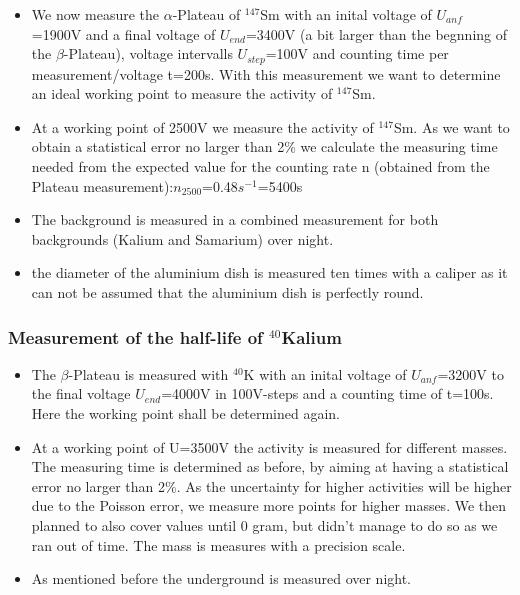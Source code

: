 \documentclass[12pt]{article}
\begin{document}
\begin{itemize}
	
	\item We now measure the $\alpha$-Plateau of ${}^{147}$Sm with an inital voltage of $U_{anf}$=1900V and a final voltage of $U_{end}$=3400V (a bit larger than the begnning of the $\beta$-Plateau), voltage intervalls $U_{step}$=100V and counting time per measurement/voltage t=200s. With this measurement we want to determine an ideal working point to measure the activity of ${}^{147}$Sm.
	
	\item At a working point of 2500V we measure the activity of ${}^{147}$Sm.
      As we want to obtain a statistical error no larger than 2\% we calculate the measuring time needed from the expected value for the counting rate n (obtained from the Plateau measurement):$n_{2500}$=0.48$s^{-1}$=5400s
      
    \item The background is measured in a combined measurement for both backgrounds (Kalium and Samarium) over night.
    
    \item the diameter of the aluminium dish is measured ten times with a caliper as it can not be assumed that the aluminium dish is perfectly round. 

\end{itemize}

\subsubsection{Measurement of the half-life of ${}^{40}$Kalium}
\label{kaliumdurchfuehrung}

\begin{itemize}
	\item The $\beta$-Plateau is measured with ${}^{40}$K with an inital voltage of $U_{anf}$=3200V to the final voltage $U_{end}$=4000V in 100V-steps and a counting time of t=100s. Here the working point shall be determined again.
	
	\item At a working point of U=3500V  the activity is measured for different masses. The measuring time is determined as before, by aiming at having a statistical error no larger than 2\%. As the uncertainty for higher activities will be higher due to the Poisson error, we measure more points for higher masses. We then planned to also cover values until 0 gram, but didn't manage to do so as we ran out of time. The mass is measures with a precision scale.
	
	\item As mentioned before the underground is measured over night.
	
\end{itemize}
\end{document}
